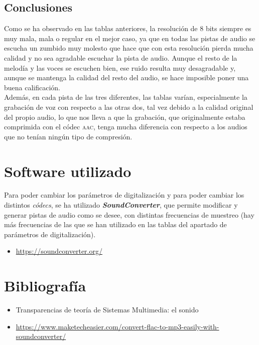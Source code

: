 \documentclass[11pt,a4paper]{article}
\begin{document}
\subsection{Conclusiones}

Como se ha observado en las tablas anteriores, la resolución de 8 bits siempre es muy mala, mala o regular en el mejor caso, ya que en todas las pistas de audio se escucha un zumbido muy molesto que hace que con esta resolución pierda mucha calidad y no sea agradable escuchar la pista de audio. Aunque el resto de la melodía y las voces se escuchen bien, ese ruido resulta muy desagradable y, aunque se mantenga la calidad del resto del audio, se hace imposible poner una buena calificación.\\

Además, en cada pista de las tres diferentes, las tablas varían, especialmente la grabación de voz con respecto a las otras dos, tal vez debido a la calidad original del propio audio, lo que nos lleva a que la grabación, que originalmente estaba comprimida con el códec \textsc{aac}, tenga mucha diferencia con respecto a los audios que no tenían ningún tipo de compresión.


\section{Software utilizado}

Para poder cambiar los parámetros de digitalización y para poder cambiar los distintos \textit{códecs}, se ha utilizado \textbf{\textit{SoundConverter}}, que permite modificar y generar pistas de audio como se desee, con distintas frecuencias de muestreo (hay más frecuencias de las que se han utilizado en las tablas del apartado de parámetros de digitalización).\\

\begin{itemize}
	\item \textcolor{blue}{\url{https://soundconverter.org/}}
\end{itemize}

\section{Bibliografía}

\begin{itemize}
	\item Transparencias de teoría de Sistemas Multimedia: el sonido
	\item \footnotesize{\textcolor{blue}{\url{https://www.maketecheasier.com/convert-flac-to-mp3-easily-with-soundconverter/}}}
\end{itemize}
\end{document}
